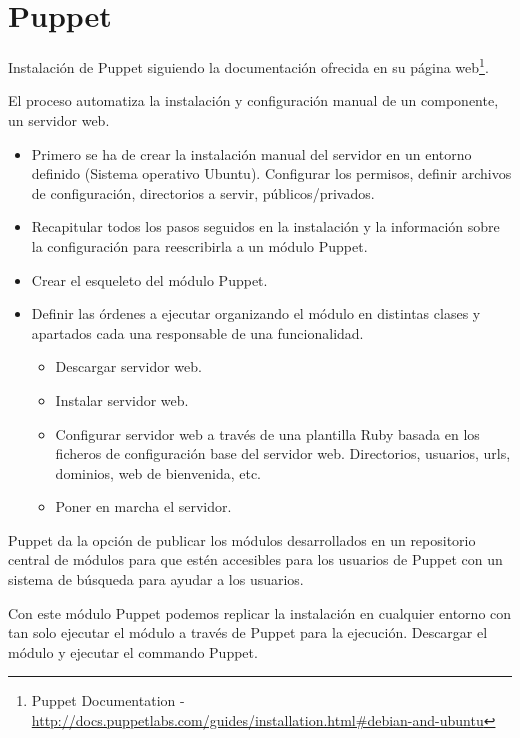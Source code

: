 \chapter{Puppet}
\label{app:apendice-puppet}

\par Instalación de Puppet siguiendo la documentación ofrecida en su página web\footnote{Puppet Documentation - \url{http://docs.puppetlabs.com/guides/installation.html\#debian-and-ubuntu}}.

\par El proceso automatiza la instalación y configuración manual de un componente, un servidor web.

\begin{itemize}
	\item Primero se ha de crear la instalación manual del servidor en un entorno definido (Sistema operativo Ubuntu). Configurar los permisos, definir archivos de configuración, directorios a servir, públicos/privados.
	\item Recapitular todos los pasos seguidos en la instalación y la información sobre la configuración para reescribirla a un módulo Puppet.
	\item Crear el esqueleto del módulo Puppet.
	\item Definir las órdenes a ejecutar organizando el módulo en distintas clases y apartados cada una responsable de una funcionalidad.
	\begin{itemize}
	    \item Descargar servidor web.
	    \item Instalar servidor web.
	    \item Configurar servidor web a través de una plantilla Ruby basada en los ficheros de configuración base del servidor web. Directorios, usuarios, urls, dominios, web de bienvenida, etc.
	    \item Poner en marcha el servidor.
    \end{itemize}
\end{itemize}

\par Puppet da la opción de publicar los módulos desarrollados en un repositorio central de módulos para que estén accesibles para los usuarios de Puppet con un sistema de búsqueda para ayudar a los usuarios.

\par Con este módulo Puppet podemos replicar la instalación en cualquier entorno con tan solo ejecutar el módulo a través de Puppet para la ejecución. Descargar el módulo y ejecutar el commando Puppet.

